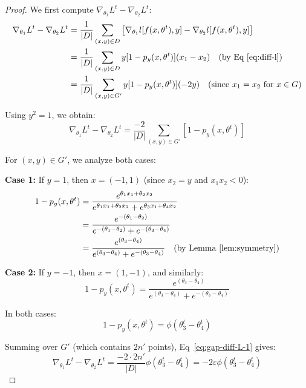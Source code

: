 \documentclass[11pt]{article}
\begin{document}
\begin{proof}
We first compute $\nabla_{\theta_1} L^t - \nabla_{\theta_2} L^t$:
\begin{align*}
\nabla_{\theta_1} L^t - \nabla_{\theta_2} L^t 
&= \frac{1}{|D|} \sum_{(x,y) \in D} \left[\nabla_{\theta_1} l[f(x, \theta^t), y] - \nabla_{\theta_2} l[f(x, \theta^t), y]\right] \\
&= \frac{1}{|D|} \sum_{(x,y) \in D} y[1 - p_y(x, \theta^t)](x_1 - x_2) \quad \text{(by Eq~\eqref{eq:diff-l})} \\
&= \frac{1}{|D|} \sum_{(x,y) \in G'} y[1 - p_y(x, \theta^t)](-2y) \quad \text{(since $x_1 = x_2$ for $x \in G$)}
\end{align*}

Using $y^2 = 1$, we obtain:
\begin{equation}
\label{eq:gap-diff-L-1}
\nabla_{\theta_1} L^t - \nabla_{\theta_2} L^t = \frac{-2}{|D|} \sum_{(x,y) \in G'} [1 - p_y(x, \theta^t)]
\end{equation}

For $(x, y) \in G'$, we analyze both cases:

\textbf{Case 1:} If $y = 1$, then $x = (-1, 1)$ (since $x_2 = y$ and $x_1 x_2 < 0$):
\begin{align*}
1 - p_y(x, \theta^t) 
&= \frac{e^{\theta_1 x_1 + \theta_2 x_2}}{e^{\theta_1 x_1 + \theta_2 x_2} + e^{\theta_3 x_1 + \theta_4 x_2}} \\
&= \frac{e^{-(\theta_1 - \theta_2)}}{e^{-(\theta_1 - \theta_2)} + e^{-(\theta_3 - \theta_4)}} \\
&= \frac{e^{(\theta_3 - \theta_4)}}{e^{(\theta_3 - \theta_4)} + e^{-(\theta_3 - \theta_4)}} \quad \text{(by Lemma~\ref{lem:symmetry})}
\end{align*}

\textbf{Case 2:} If $y = -1$, then $x = (1, -1)$, and similarly:
$$1 - p_y(x, \theta^t) = \frac{e^{(\theta_3 - \theta_4)}}{e^{(\theta_3 - \theta_4)} + e^{-(\theta_3 - \theta_4)}}$$

In both cases:
\begin{equation}
\label{eq:py-formula}
1 - p_y(x, \theta^t) = \phi(\theta_3^t - \theta_4^t)
\end{equation}

Summing over $G'$ (which contains $2n'$ points), Eq~\eqref{eq:gap-diff-L-1} gives:
\begin{equation}
\label{eq:gap-diff-L-1-bis}
\nabla_{\theta_1} L^t - \nabla_{\theta_2} L^t = \frac{-2 \cdot 2n'}{|D|} \phi(\theta_3^t - \theta_4^t) = -2\varepsilon \phi(\theta_3^t - \theta_4^t)
\end{equation}


\end{proof}
\end{document}
